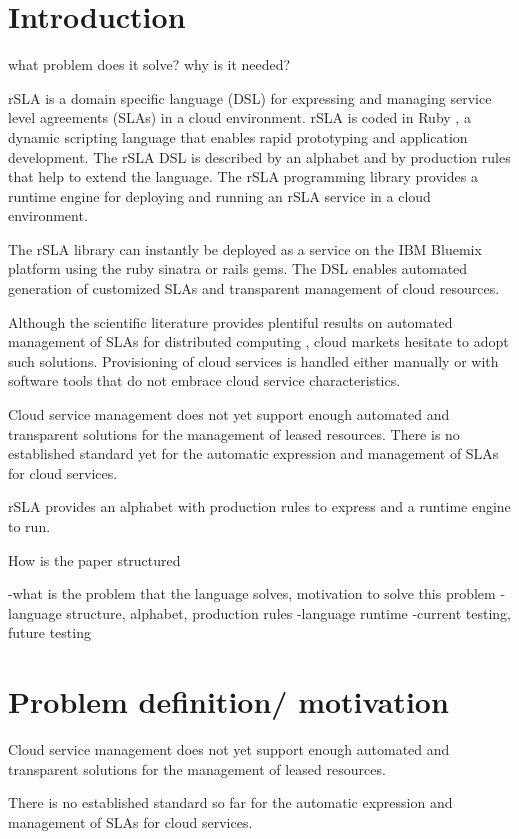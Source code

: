 \documentclass{llncs}
\begin{document}
\lstset{numbers=left, basicstyle=\small, numbersep=5pt, numberstyle=\tiny}

\section{Introduction}
what problem does it solve? why is it needed? 

rSLA is a domain specific language (DSL) for expressing and managing service level agreements (SLAs) in a cloud environment. rSLA is coded in Ruby \cite{ruby}, a dynamic scripting language that enables rapid prototyping and application development. The rSLA DSL is described by an alphabet and by production rules that help to extend the language. The rSLA programming library provides a runtime engine for deploying and running an rSLA service in a cloud environment.

The rSLA library can instantly be deployed as a service on the IBM Bluemix platform using the ruby sinatra or rails gems. The DSL enables automated generation of customized SLAs and transparent management of cloud resources.

Although the scientific literature provides plentiful results on automated management of SLAs for distributed computing \cite{wsla, wsag, more}, cloud markets hesitate to adopt such solutions. Provisioning of cloud services is handled either manually or with software tools that do not embrace cloud service characteristics.

Cloud service management does not yet support enough automated and transparent solutions for the management of leased resources. There is no established standard yet for the automatic expression and management of SLAs for cloud services.

rSLA provides an alphabet with production rules to express and a runtime engine to run.

How is the paper structured

-what is the problem that the language solves, motivation to solve this problem
-language structure, alphabet, production rules
-language runtime
-current testing, future testing

\section{Problem definition/ motivation}
Cloud service management does not yet support enough automated and transparent solutions for the management of leased resources. 

There is no established standard so far for the automatic expression and management of SLAs for cloud services.
\end{document}

